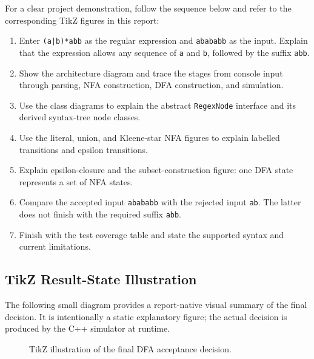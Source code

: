 \documentclass[12pt,a4paper]{report}
\begin{document}
For a clear project demonstration, follow the sequence below and refer to the corresponding TikZ figures in this report:
\begin{enumerate}
  \item Enter \texttt{(a|b)*abb} as the regular expression and \texttt{abababb} as the input. Explain that the expression allows any sequence of \texttt{a} and \texttt{b}, followed by the suffix \texttt{abb}.
  \item Show the architecture diagram and trace the stages from console input through parsing, NFA construction, DFA construction, and simulation.
  \item Use the class diagrams to explain the abstract \texttt{RegexNode} interface and its derived syntax-tree node classes.
  \item Use the literal, union, and Kleene-star NFA figures to explain labelled transitions and epsilon transitions.
  \item Explain epsilon-closure and the subset-construction figure: one DFA state represents a set of NFA states.
  \item Compare the accepted input \texttt{abababb} with the rejected input \texttt{ab}. The latter does not finish with the required suffix \texttt{abb}.
  \item Finish with the test coverage table and state the supported syntax and current limitations.
\end{enumerate}

\subsection{TikZ Result-State Illustration}
The following small diagram provides a report-native visual summary of the final decision. It is intentionally a static explanatory figure; the actual decision is produced by the C++ simulator at runtime.
\begin{figure}[H]
\centering
{}
\caption{TikZ illustration of the final DFA acceptance decision.}
\label{fig:result-decision}
\end{figure}
\end{document}
